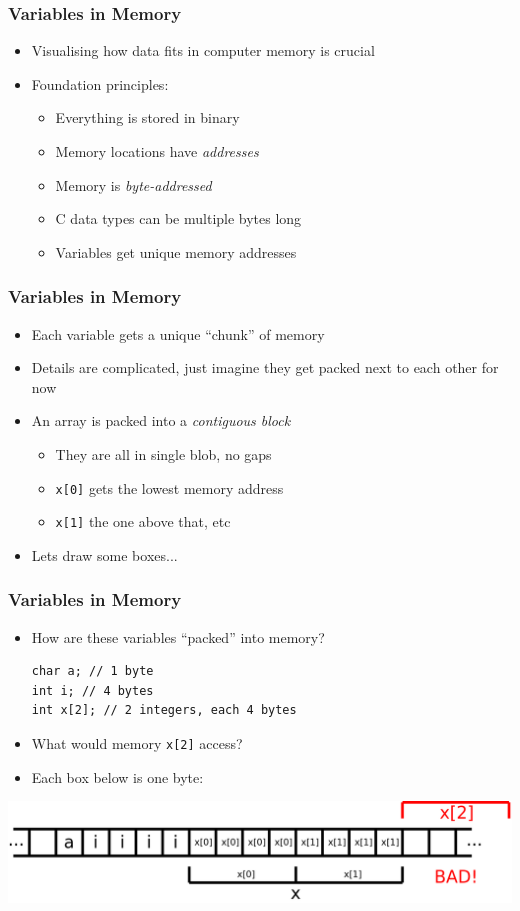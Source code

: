 \documentclass[14pt]{beamer}
\begin{document}
\begin{frame}
\frametitle{Variables in Memory}
\begin{itemize}
\item Visualising how data fits in computer memory is crucial
\item Foundation principles:
	\begin{itemize}
		\item Everything is stored in binary
		\item Memory locations have \textit{addresses}
		\item Memory is \textit{byte-addressed}
		\item C data types can be multiple bytes long
		\item Variables get unique memory addresses
	\end{itemize}

\end{itemize}
\end{frame}

\begin{frame}
\frametitle{Variables in Memory}
\begin{itemize}
\item Each variable gets a unique ``chunk'' of memory
\item Details are complicated, just imagine they get packed next to each other for now
\item An array is packed into a \textit{contiguous block}
	\begin{itemize}
		\item They are all in single blob, no gaps
		\item \texttt{x[0]} gets the lowest memory address
		\item \texttt{x[1]} the one above that, etc
	\end{itemize}
\item Lets draw some boxes...
\end{itemize}
\end{frame}

\begin{frame}[fragile]
\frametitle{Variables in Memory}
\begin{itemize}
\item How are these variables ``packed'' into memory?
\begin{lstlisting}[style=CStyle]
char a; // 1 byte
int i; // 4 bytes
int x[2]; // 2 integers, each 4 bytes
\end{lstlisting}
\pause
\item What would memory \texttt{x[2]} access?
\pause
\item Each box below is one byte:
\end{itemize}
\includegraphics[width=\textwidth]{memory}
\end{frame}
\end{document}
